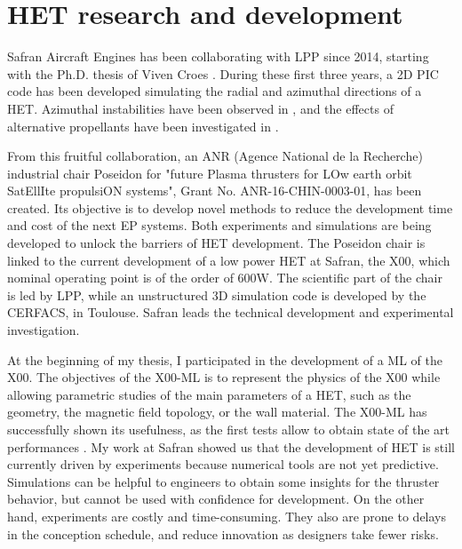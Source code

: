 

\section{\acs{HET} research and development}
\label{sec-poseidon}

Safran Aircraft Engines has been collaborating with \ac{LPP} since 2014, starting with the Ph.D. thesis of Viven Croes \citep{croes2017}.
During these first three years, a \ac{2D} \ac{PIC} code has been developed simulating the radial and azimuthal directions of a \ac{HET}.
Azimuthal instabilities have been observed in \citet{croes2017a}, and the effects of alternative propellants have been investigated in \citet{croes2018}.

From this fruitful collaboration, an ANR (Agence National de la Recherche) industrial chair {\sc Poseidon} for  "future Plasma thrusters for LOw earth orbit SatEllIte propulsiON systems", Grant No. ANR-16-CHIN-0003-01, has been created.
Its objective is to develop novel methods to reduce the development time and cost of the next \ac{EP} systems.
Both experiments and simulations are being developed to unlock the barriers of \ac{HET} development.
The {\sc Poseidon} chair is linked to the current development of a  low power \ac{HET} at Safran, the \PPS X00, which nominal operating point is of the order of 600W.
The scientific part of the chair is led by \ac{LPP}, while an unstructured \ac{3D} simulation code is developed by the CERFACS, in Toulouse.
Safran leads the technical development and experimental investigation.

At the beginning of my thesis, I participated in the development of a \ac{ML} of the \PPS X00.
The objectives of the \PPS X00-\ac{ML}  is to represent the physics of the \PPS X00 while allowing parametric studies of the main parameters of a \ac{HET}, such as the geometry, the magnetic field topology, or the wall material.
The \PPS X00-\ac{ML} has successfully shown its usefulness, as the first tests allow to obtain state of the art performances \citep{vaudolon2018}.
My work at Safran showed us that the development of \ac{HET} is still currently driven by experiments because numerical tools are not yet predictive.
Simulations can be helpful to engineers to obtain some insights for the thruster behavior, but cannot be used with confidence for development.
On the other hand, experiments are costly and time-consuming.
They also are prone to delays in the conception schedule, and reduce innovation as designers take fewer risks.

